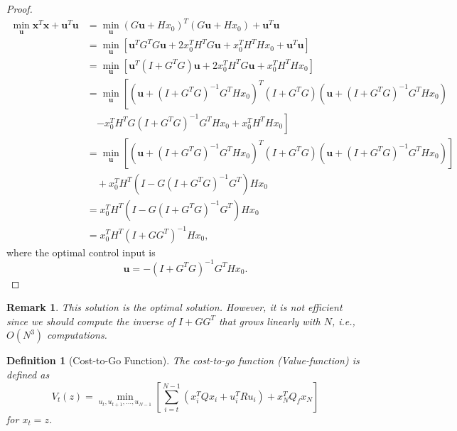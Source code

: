 \documentclass[a4 paper]{article}
\numberwithin{equation}{section}
\theoremstyle{boldStyle}
\newtheorem{remark}{Remark}[section]
\theoremstyle{boldBlueStyle}
\theoremstyle{boldPurpleStyle}
\theoremstyle{boldRedStyle}
\newtheorem{definition}{Definition}[section]
\begin{document}
\begin{proof}
  \begin{align*}
  \min_{\mathbf{u}} \mathbf{x}^T \mathbf{x} + \mathbf{u}^T \mathbf{u} &= \min_{\mathbf{u}} (G\mathbf{u} + H x_0)^T (G\mathbf{u} + H x_0) + \mathbf{u}^T \mathbf{u} \\
  &= \min_{\mathbf{u}} \left[ \mathbf{u}^T G^T G \mathbf{u} + 2 x_0^T H^T G \mathbf{u} + x_0^T H^T H x_0 + \mathbf{u}^T \mathbf{u} \right] \\
  &= \min_{\mathbf{u}} \left[ \mathbf{u}^T (I + G^T G) \mathbf{u} + 2 x_0^T H^T G \mathbf{u} + x_0^T H^T H x_0 \right] \\
  &= \min_{\mathbf{u}} \left[ (\mathbf{u} + (I + G^T G)^{-1} G^T H x_0)^T (I + G^T G) (\mathbf{u} + (I + G^T G)^{-1} G^T H x_0) \right. \\
  & \quad \left. - x_0^T H^T G (I + G^T G)^{-1} G^T H x_0 + x_0^T H^T H x_0 \right] \\
  &= \min_{\mathbf{u}} \left[ (\mathbf{u} + (I + G^T G)^{-1} G^T H x_0)^T (I + G^T G) (\mathbf{u} + (I + G^T G)^{-1} G^T H x_0) \right] \\
  & \quad + x_0^T H^T (I - G (I + G^T G)^{-1} G^T) H x_0 \\
  &= x_0^T H^T (I - G (I + G^T G)^{-1} G^T) H x_0 \\
  &= x_0^T H^T (I + G G^T)^{-1} H x_0,
  \end{align*}
  where the optimal control input is
  \[
  \mathbf{u} = -(I + G^T G)^{-1} G^T H x_0.
  \]
\end{proof}
      
  
\begin{remark}
  This solution is the optimal solution. However, it is not efficient since we should compute the inverse of
  \( I + G G^T \) that grows linearly with \( N \), i.e., \( O(N^3) \) computations. 
\end{remark}
  
\begin{definition}[Cost-to-Go Function]
The cost-to-go function (Value-function) is defined as
\[
V_t(z) = \min_{u_t, u_{t+1}, \ldots, u_{N-1}} \left[ \sum_{i=t}^{N-1} (x_i^T Q x_i + u_i^T R u_i) + x_N^T Q_f x_N \right]
\]
for \( x_t = z \).
\end{definition}
\end{document}
